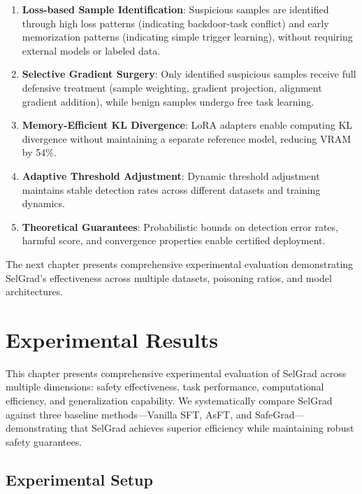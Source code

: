 \begin{enumerate}
    \item \textbf{Loss-based Sample Identification}: Suspicious samples are identified through high loss patterns (indicating backdoor-task conflict) and early memorization patterns (indicating simple trigger learning), without requiring external models or labeled data.

    \item \textbf{Selective Gradient Surgery}: Only identified suspicious samples receive full defensive treatment (sample weighting, gradient projection, alignment gradient addition), while benign samples undergo free task learning.

    \item \textbf{Memory-Efficient KL Divergence}: LoRA adapters enable computing KL divergence without maintaining a separate reference model, reducing VRAM by 54\%.

    \item \textbf{Adaptive Threshold Adjustment}: Dynamic threshold adjustment maintains stable detection rates across different datasets and training dynamics.

    \item \textbf{Theoretical Guarantees}: Probabilistic bounds on detection error rates, harmful score, and convergence properties enable certified deployment.
\end{enumerate}

The next chapter presents comprehensive experimental evaluation demonstrating SelGrad's effectiveness across multiple datasets, poisoning ratios, and model architectures.

\chapter{Experimental Results}
\label{cha:Experimental Results}

This chapter presents comprehensive experimental evaluation of SelGrad across multiple dimensions: safety effectiveness, task performance, computational efficiency, and generalization capability. We systematically compare SelGrad against three baseline methods---Vanilla SFT, AsFT, and SafeGrad---demonstrating that SelGrad achieves superior efficiency while maintaining robust safety guarantees.

\section{Experimental Setup}
\label{sec:setup}

